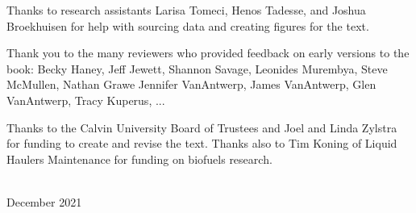 Thanks to research assistants Larisa Tomeci, Henos Tadesse, and Joshua Broekhuisen
for help with sourcing data and creating figures for the text. 

Thank you to the many reviewers who provided feedback on early versions to the book:
Becky Haney, Jeff Jewett, Shannon Savage, Leonides Murembya, Steve McMullen, Nathan Grawe
Jennifer VanAntwerp, James VanAntwerp, Glen VanAntwerp, Tracy Kuperus, ...

Thanks to the Calvin University Board of Trustees and Joel and Linda Zylstra
for funding to create and revise the text.
Thanks also to Tim Koning of Liquid Haulers Maintenance for funding on biofuels research.



\vspace*{2pc}
\noindent\AUTHORS\\
\noindent December 2021
 
\clearpage

\blankpage

